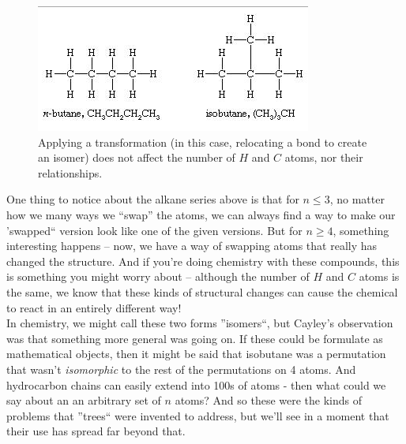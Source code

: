 \documentclass[a4paper,10pt]{report}
\begin{document}
\begin{figure}[H]
	\begin{centering}
	\begin{center}
	\includegraphics[width=\linewidth]{./hydrocarbons.png}
	\caption{Applying a transformation (in this case, relocating a bond to create an isomer) does not affect the number of $H$ and $C$ atoms, nor their relationships.}
	\label{fig:hydrocarbons}
	\end{center}
	\par\end{centering}
\end{figure}

One thing to notice about the alkane series above is that for $n\leq 3$, no matter how we many ways we ``swap'' the atoms, we can always find a way to make our 'swapped`` version look like one of the given versions. But for $n \geq 4$, something interesting happens -- now, we have a way of swapping atoms that really has changed the structure. And if you're doing chemistry with these compounds, this is something you might worry about -- although the number of $H$ and $C$ atoms is the same, we know that these kinds of structural changes can cause the chemical to react in an entirely different way!\\

In chemistry, we might call these two forms ''isomers``, but Cayley's observation was that something more general was going on. If these could be formulate as mathematical objects, then it might be said that isobutane was a permutation that wasn't \textit{isomorphic} to the rest of the permutations on 4 atoms. And hydrocarbon chains can easily extend into 100s of atoms - then what could we say about an an arbitrary set of $n$ atoms? And so these were the kinds of problems that ''trees`` were invented to address, but we'll see in a moment that their use has spread far beyond that.\\
\end{document}
